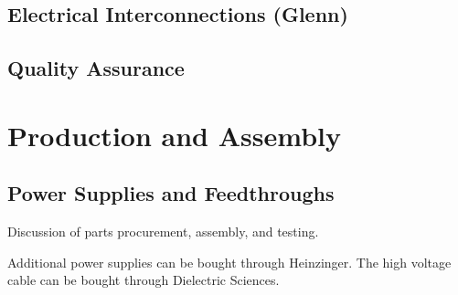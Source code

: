 



\subsection{Electrical Interconnections (Glenn)}


\subsection{Quality Assurance}
\label{sec:fddp-hv-qa}



\section{Production and Assembly}
\label{sec:fddp-hv-prod-assy}

\subsection{Power Supplies and Feedthroughs}
\label{sec:fddp-hv-supplies-feedthroughs}

Discussion of parts procurement, assembly, and testing.

Additional power supplies can be bought through Heinzinger.   The high voltage cable can be bought through Dielectric Sciences.  

